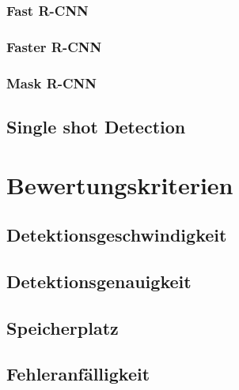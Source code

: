 \documentclass[12pt,
titlepage,
a4paper,
oneside,     %
openany,     %
listof=totoc,  %
numbers = noenddot, %
bibliography=totoc,    %
headsepline, %
]{scrbook} %
\begin{document}
\subsection{Fast R-CNN}
\label{subsec_frcnn}



\subsection{Faster R-CNN}
\label{subsec_ffrcnn}



\subsection{Mask R-CNN}
\label{subsec_mrcnn}



\section{Single shot Detection}
\label{sec_ssd}



\chapter{Bewertungskriterien}
\label{cha:bewertungskriterien} 



\section{Detektionsgeschwindigkeit}
\label{sec_detgeschw}



\section{Detektionsgenauigkeit}
\label{sec_detgenau}



\section{Speicherplatz}
\label{sec_speicher}



\section{Fehleranfälligkeit}
\label{sec_fehler}
\end{document}
